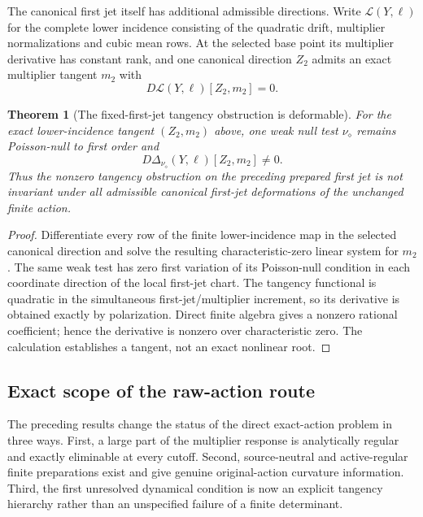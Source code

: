 \documentclass[11pt]{article}
\newtheorem{theorem}{Theorem}[section]
\theoremstyle{definition}
\theoremstyle{remark}
\begin{document}
The canonical first jet itself has additional admissible directions.  Write
$\mathcal L(Y,\ell)$ for the complete lower incidence consisting of the
quadratic drift, multiplier normalizations and cubic mean rows.  At the
selected base point its multiplier derivative has constant rank, and one
canonical direction $Z_2$ admits an exact multiplier tangent $m_2$ with
\begin{equation}
 D\mathcal L(Y,\ell)[Z_2,m_2]=0.
 \label{eq:supp-exact-lower-tangent}
\end{equation}

\begin{theorem}[The fixed-first-jet tangency obstruction is deformable]
\label{thm:supp-exact-upstream-deformation}
For the exact lower-incidence tangent $(Z_2,m_2)$ above, one weak null test
$\nu_\diamond$ remains Poisson-null to first order and
\begin{equation}
 \boxed{D\Delta_{\nu_\diamond}(Y,\ell)[Z_2,m_2]\ne0.}
 \label{eq:supp-exact-upstream-nonzero}
\end{equation}
Thus the nonzero tangency obstruction on the preceding prepared first jet is
not invariant under all admissible canonical first-jet deformations of the
unchanged finite action.
\end{theorem}
\begin{proof}
Differentiate every row of the finite lower-incidence map in the selected
canonical direction and solve the resulting characteristic-zero linear system
for $m_2$.  The same weak test has zero first variation of its Poisson-null
condition in each coordinate direction of the local first-jet chart.  The
tangency functional is quadratic in the simultaneous first-jet/multiplier
increment, so its derivative is obtained exactly by polarization.  Direct
finite algebra gives a nonzero rational coefficient; hence the derivative is
nonzero over characteristic zero.  The calculation establishes a tangent,
not an exact nonlinear root.
\end{proof}

\subsection{Exact scope of the raw-action route}

The preceding results change the status of the direct exact-action problem in
three ways.  First, a large part of the multiplier response is analytically
regular and exactly eliminable at every cutoff.  Second, source-neutral and
active-regular finite preparations exist and give genuine original-action
curvature information.  Third, the first unresolved dynamical condition is
now an explicit tangency hierarchy rather than an unspecified failure of a
finite determinant.
\end{document}
